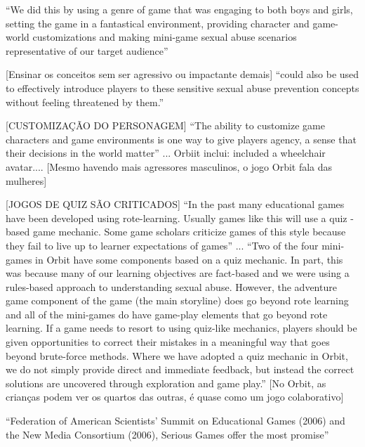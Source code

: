 ``We did this by using a genre of game that was engaging to both boys and girls, setting the game in a fantastical environment, providing character and game-world customizations and making mini-game sexual abuse scenarios representative of our target audience''\cite{dip2016advancing}

[Ensinar os conceitos sem ser agressivo ou impactante demais]
``could also be used to effectively introduce players to these sensitive sexual abuse prevention concepts without feeling threatened by them.''\cite{dip2016advancing}

[CUSTOMIZAÇÃO DO PERSONAGEM]
``The ability to customize game characters and game environments is one way to give players agency, a sense that their decisions in the world matter''\cite{dip2016advancing}  ... Orbiit inclui: included a wheelchair avatar.... [Mesmo havendo mais agressores masculinos, o jogo Orbit fala das mulheres]
 
[JOGOS DE QUIZ SÃO CRITICADOS]
``In the past many educational games have been developed using rote-learning. Usually games like this will use a quiz - based game mechanic. Some game scholars criticize games of this style because they fail to live up to learner expectations of games''\cite{dip2016advancing} ... ``Two of the four mini-games in Orbit have some components based on a quiz mechanic. In part, this was because many of our learning objectives are fact-based and we were using a rules-based approach to understanding sexual abuse. However, the adventure game component of the game (the main storyline) does go beyond rote learning and all of the mini-games do have game-play elements that go beyond rote learning. If a game needs to resort to using quiz-like mechanics, players should be given opportunities to correct their mistakes in a meaningful way that goes beyond brute-force methods. Where we have adopted a quiz mechanic in Orbit, we do not simply provide direct and immediate feedback, but instead the correct solutions are uncovered through exploration and game play.'' [No Orbit, as crianças podem ver os quartos das outras, é quase como um jogo colaborativo]


``Federation of American Scientists' Summit on Educational Games (2006) and the New Media Consortium (2006), Serious Games offer the most promise''


